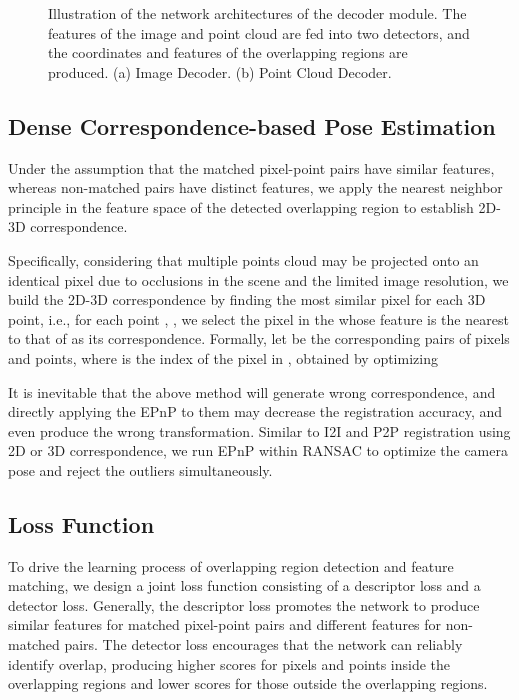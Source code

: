\documentclass[lettersize,journal]{IEEEtran}
\begin{document}
\begin{figure*}[!htbp]
\centering
{}

\caption{Illustration of the network architectures of the decoder module. The features of the image and point cloud are fed into two detectors, and the coordinates and features of the overlapping regions are produced. (a) Image Decoder. (b) Point Cloud Decoder.}
\label{FIG5}
\end{figure*}

\subsection{Dense Correspondence-based Pose Estimation}
Under the assumption that the matched pixel-point pairs have similar features, whereas non-matched pairs have distinct features, we apply the nearest neighbor principle in the feature space of the detected overlapping region to establish 2D-3D correspondence.

Specifically, considering that multiple points cloud may be projected onto an identical pixel due to occlusions in the scene and the limited image resolution, we build the 2D-3D correspondence by finding the most similar pixel for each 3D point, i.e., 
for each point , , we select the pixel in the  whose feature is the nearest to that of   as its correspondence. 
Formally, let  be the corresponding pairs of pixels and points, where  is the index of the pixel in , obtained by optimizing 


It is inevitable that the above method will generate wrong correspondence, and directly applying the EPnP to them may decrease the registration accuracy, and even produce the wrong transformation. Similar to I2I and P2P registration using 2D or 3D correspondence, we run EPnP within RANSAC to optimize the camera pose and reject the outliers simultaneously. 

\subsection{Loss Function}
To drive the learning process of overlapping region detection and feature matching, we design a joint loss function consisting of a descriptor loss and a detector loss.  Generally, the descriptor loss promotes the network to produce similar features for matched pixel-point pairs and different features for non-matched pairs.
The detector loss encourages that the network can reliably identify overlap, producing higher scores for pixels and points inside the overlapping regions and lower scores for those outside the overlapping regions.\\
\end{document}
